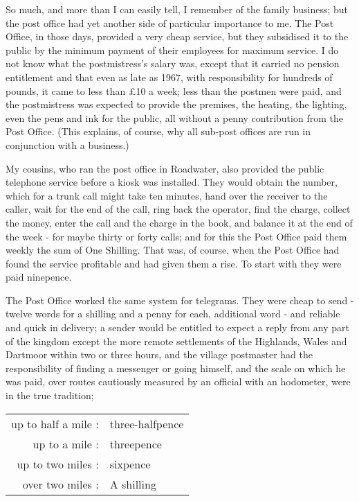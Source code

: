 So much, and more than I can easily tell, I remember of the family business; but the post office had yet another side of particular importance to me. 
The Post Office, in those days, provided a very cheap service, but they subsidised it to the public by the minimum payment of their employees for maximum service. I do not know what the postmistress's salary was, except that it carried no pension entitlement and that even as late as 1967, with responsibility for hundreds of pounds, it came to less than £10 a week; less than the postmen were paid, and the postmistress was expected to provide the premises, the heating, the lighting, even the pens and ink for the public, all without a penny contribution from the Post Office. (This explains, of course, why all sub-post offices are run in conjunction with a business.)

My cousins, who ran the post office in Roadwater, also provided the public telephone service before a kiosk was installed. They would obtain the number, which for a trunk call might take ten minutes, hand over the receiver to the caller, wait for the end of the call, ring back the operator, find the charge, collect the money, enter the call and the charge in the book, and balance it at the end of the week - for maybe thirty or forty calls; and for this the Post Office paid them weekly the sum of One Shilling. That was, of course, when the Post Office had found the service profitable and had given them a rise. To start with they were paid ninepence.

The Post Office worked the same system for telegrams. They were cheap to send - twelve words for a shilling and a penny for each, additional word - and reliable and quick in delivery; a sender would be entitled to expect a reply from any part of the kingdom except the more remote settlements of the Highlands, Wales and Dartmoor within two or three hours, and the village postmaster had the responsibility of finding a messenger or going himself, and the scale on which he was paid, over routes cautiously measured by an official with an hodometer, were in the true tradition;

\noindent
\begin{tabularx}{\textwidth}{@{}r<{:}@{\ }X@{}}
          up to half a mile & three-halfpence \\
  up to a mile & threepence \\
    up to two miles & sixpence \\
    over two miles  & A shilling \\
\end{tabularx}


